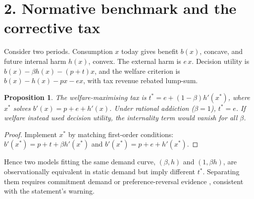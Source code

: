 \documentclass[11pt]{article}
\newtheorem{proposition}[theorem]{Proposition}
\theoremstyle{definition}
\begin{document}
\section*{2. Normative benchmark and the corrective tax}
Consider two periods. Consumption $x$ today gives benefit $b(x)$, concave, and future internal harm $h(x)$, convex. The
external harm is $e\,x$. Decision utility is $b(x)-\beta h(x)-(p+t)x$, and the welfare criterion is
$b(x)-h(x)-px-ex$, with tax revenue rebated lump-sum.
\begin{proposition}\label{prop:tax}
The welfare-maximising tax is $t^*=e+(1-\beta)h'(x^*)$, where $x^*$ solves $b'(x)=p+e+h'(x)$. Under rational addiction
($\beta=1$), $t^*=e$. If welfare instead used decision utility, the internality term would vanish for all $\beta$.
\end{proposition}
\begin{proof}
Implement $x^*$ by matching first-order conditions: $b'(x^*)=p+t+\beta h'(x^*)$ and $b'(x^*)=p+e+h'(x^*)$.
\end{proof}
Hence two models fitting the same demand curve, $(\beta,h)$ and $(1,\beta h)$, are observationally equivalent in
static demand but imply different $t^*$. Separating them requires commitment demand or preference-reversal evidence
\cite{gk}, consistent with the statement's warning.
\end{document}
